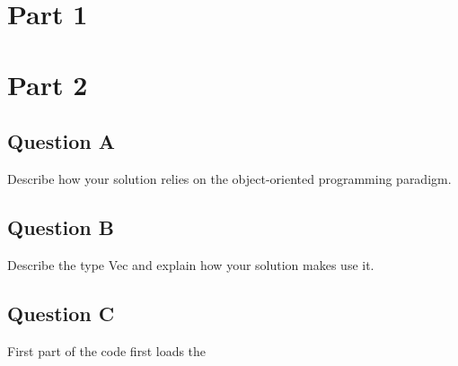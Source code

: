 \documentclass{article}
\begin{document}
\maketitle



\section{Part 1}

\section{Part 2}

\subsection{Question A}
 Describe how your solution relies on the object-oriented programming paradigm.

 \subsection{Question B}

Describe the type Vec and explain how your solution makes use it.

 \subsection{Question C}

First part of the code first loads the 
\end{document}
